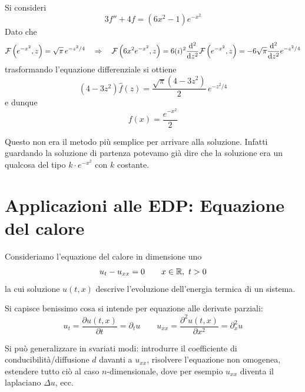 \begin{exa}
Si consideri
\begin{equation*}
3f''+4f=(6x^2-1)e^{-x^2}
\end{equation*}
Dato che
\begin{equation*}
\mathcal{F}\left(e^{-x^2},z\right)=\sqrt{\pi}\,e^{-z^2/4 }\quad\Rightarrow\quad\mathcal{F}\left(6x^2e^{-x^2},z\right)=6(i)^2\frac{\mathrm{d}^2}{\mathrm{d} z^2}\mathcal{F}\left(e^{-x^2},z\right)=-6\sqrt{\pi}\frac{\mathrm{d}^2}{\mathrm{d} z^2}e^{-z^2/4}
\end{equation*}
trasformando l'equazione differenziale si ottiene
\begin{equation*}
(4-3z^2)\hat{f}(z)=\frac{\sqrt{\pi}(4-3z^2)}{2}\,e^{-z^2/4}
\end{equation*}
e dunque 
\begin{equation*}
f(x)=\frac{e^{-x^2}}{2}
\end{equation*}
\begin{rem}
Questo non era il metodo più semplice per arrivare alla soluzione. Infatti guardando la soluzione di partenza potevamo già dire che la soluzione era un qualcosa del tipo $k\cdot e^{-x^2}$ con $k$ costante.
\end{rem}

\end{exa}


\section{Applicazioni alle EDP: Equazione del calore}

Consideriamo l'equazione del calore in dimensione uno
\begin{equation*}
u_{t} - u_{xx} = 0\qquad x\in\RR,\ t>0
\end{equation*}
la cui soluzione $u(t,x)$ descrive l'evoluzione dell'energia termica di un sistema.

Si capisce benissimo cosa si intende per equazione alle derivate parziali:
\begin{equation*}
u_t=\frac{\partial u(t,x)}{\partial t}=\partial_t u\qquad u_{xx}=\frac{\partial^2 u(t,x)}{\partial x^2}=\partial^2_{x} u
\end{equation*}

\begin{rem}
Si può generalizzare in svariati modi: introdurre il coefficiente di conducibilità/diffusione $d$ davanti a $u_{xx}$, risolvere l'equazione non omogenea, estendere tutto ciò al caso $n$-dimensionale, dove per esempio $u_{xx}$ diventa il laplaciano $\Delta u$, ecc.
\end{rem}

